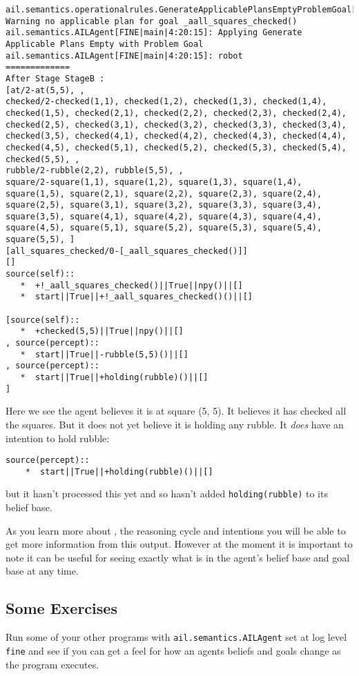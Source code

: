 \begin{verbatim}
ail.semantics.operationalrules.GenerateApplicablePlansEmptyProblemGoal[WARNING|main|4:20:15]: Warning no applicable plan for goal _aall_squares_checked() 
ail.semantics.AILAgent[FINE|main|4:20:15]: Applying Generate Applicable Plans Empty with Problem Goal 
ail.semantics.AILAgent[FINE|main|4:20:15]: robot
=============
After Stage StageB :
[at/2-at(5,5), , 
checked/2-checked(1,1), checked(1,2), checked(1,3), checked(1,4), checked(1,5), checked(2,1), checked(2,2), checked(2,3), checked(2,4), checked(2,5), checked(3,1), checked(3,2), checked(3,3), checked(3,4), checked(3,5), checked(4,1), checked(4,2), checked(4,3), checked(4,4), checked(4,5), checked(5,1), checked(5,2), checked(5,3), checked(5,4), checked(5,5), , 
rubble/2-rubble(2,2), rubble(5,5), , 
square/2-square(1,1), square(1,2), square(1,3), square(1,4), square(1,5), square(2,1), square(2,2), square(2,3), square(2,4), square(2,5), square(3,1), square(3,2), square(3,3), square(3,4), square(3,5), square(4,1), square(4,2), square(4,3), square(4,4), square(4,5), square(5,1), square(5,2), square(5,3), square(5,4), square(5,5), ]
[all_squares_checked/0-[_aall_squares_checked()]]
[]
source(self):: 
   *  +!_aall_squares_checked()||True||npy()||[]
   *  start||True||+!_aall_squares_checked()()||[]

[source(self):: 
   *  +checked(5,5)||True||npy()||[]
, source(percept):: 
   *  start||True||-rubble(5,5)()||[]
, source(percept):: 
   *  start||True||+holding(rubble)()||[]
] 
\end{verbatim}
Here we see the agent believes it is at square (5, 5).  It believes it
has checked all the squares.  But it does not yet believe it is
holding any rubble.  It \emph{does} have an intention to hold rubble: 
\begin{verbatim}
source(percept):: 
    *  start||True||+holding(rubble)()||[]
\end{verbatim}
but it hasn't processed this yet and so hasn't added
\texttt{holding(rubble)} to its belief base. 

As you learn more about \gwendolen, the reasoning cycle and intentions
you will be able to get more information from this output.  However at
the moment it is important to note it can be useful for seeing exactly
what is in the agent's belief base and goal base at any
time. 

\subsection{Some Exercises}
Run some of your other programs with
\texttt{ail.semantics.AILAgent} set at log
level \texttt{fine} and see if you can get a feel for how an agents
beliefs and goals change as the program executes. 

